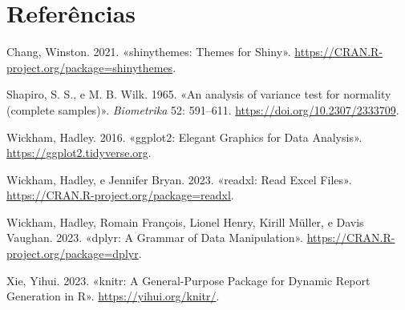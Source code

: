 \documentclass[
  letterpaper,
  DIV=11,
  numbers=noendperiod]{scrartcl}
\newlength{\cslhangindent}
\newenvironment{CSLReferences}[2] %
 {\begin{list}{}{%
  \setlength{\itemindent}{0pt}
  \setlength{\leftmargin}{0pt}
  \setlength{\parsep}{0pt}
  \ifodd #1
   \setlength{\leftmargin}{\cslhangindent}
   \setlength{\itemindent}{-1\cslhangindent}
  \fi
  \setlength{\itemsep}{#2\baselineskip}}}
 {\end{list}}
\begin{document}
\section*{Referências}\label{referuxeancias}

\label{refs}
\begin{CSLReferences}{1}{0}
Chang, Winston. 2021. {«shinythemes: Themes for Shiny»}.
\url{https://CRAN.R-project.org/package=shinythemes}.

Shapiro, S. S., e M. B. Wilk. 1965. {«An analysis of variance test for
normality (complete samples)»}. \emph{Biometrika} 52: 591--611.
\url{https://doi.org/10.2307/2333709}.

Wickham, Hadley. 2016. {«ggplot2: Elegant Graphics for Data Analysis»}.
\url{https://ggplot2.tidyverse.org}.

Wickham, Hadley, e Jennifer Bryan. 2023. {«readxl: Read Excel Files»}.
\url{https://CRAN.R-project.org/package=readxl}.

Wickham, Hadley, Romain François, Lionel Henry, Kirill Müller, e Davis
Vaughan. 2023. {«dplyr: A Grammar of Data Manipulation»}.
\url{https://CRAN.R-project.org/package=dplyr}.

Xie, Yihui. 2023. {«knitr: A General-Purpose Package for Dynamic Report
Generation in R»}. \url{https://yihui.org/knitr/}.

\end{CSLReferences}
\end{document}
